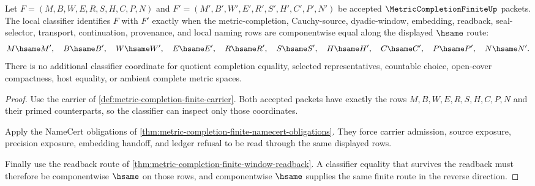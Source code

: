 \begin{theorem}
\label{thm:metric-completion-finite-classifier-exactness}
Let $F=(M,B,W,E,R,S,H,C,P,N)$ and $F'=(M',B',W',E',R',S',H',C',P',N')$ be accepted $\MetricCompletionFiniteUp$ packets. The local classifier identifies $F$ with $F'$ exactly when the metric-completion, Cauchy-source, dyadic-window, embedding, readback, seal-selector, transport, continuation, provenance, and local naming rows are componentwise equal along the displayed $\hsame$ route:
$$
M \hsame M',\quad B \hsame B',\quad W \hsame W',\quad E \hsame E',\quad R \hsame R',\quad S \hsame S',\quad H \hsame H',\quad C \hsame C',\quad P \hsame P',\quad N \hsame N' .
$$
There is no additional classifier coordinate for quotient completion equality, selected representatives, countable choice, open-cover compactness, host equality, or ambient complete metric spaces.
\end{theorem}
\begin{proof}
Use the carrier of \autoref{def:metric-completion-finite-carrier}. Both accepted packets have exactly the rows $M,B,W,E,R,S,H,C,P,N$ and their primed counterparts, so the classifier can inspect only those coordinates.

Apply the NameCert obligations of \autoref{thm:metric-completion-finite-namecert-obligations}. They force carrier admission, source exposure, precision exposure, embedding handoff, and ledger refusal to be read through the same displayed rows.

Finally use the readback route of \autoref{thm:metric-completion-finite-window-readback}. A classifier equality that survives the readback must therefore be componentwise $\hsame$ on those rows, and componentwise $\hsame$ supplies the same finite route in the reverse direction.
\end{proof}

